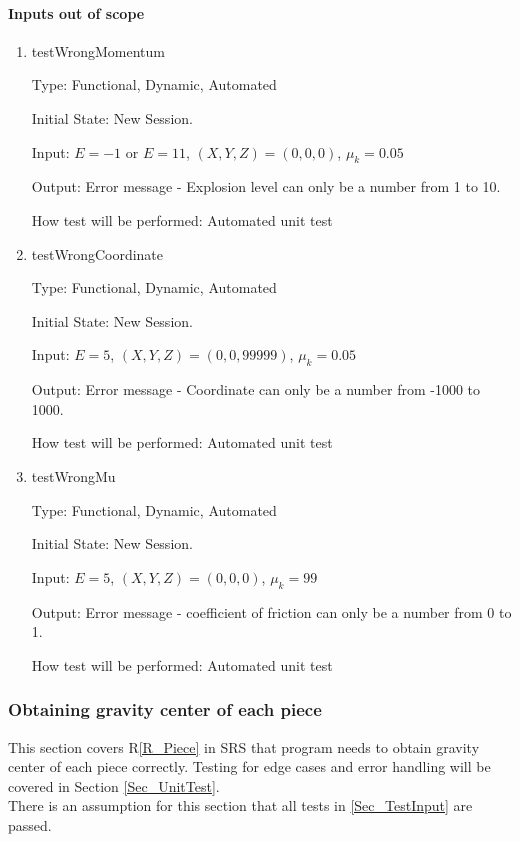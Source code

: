 \documentclass[12pt, titlepage]{article}
\newcommand{\rref}[1]{R\ref{#1}}
\begin{document}
\paragraph{Inputs out of scope}

\begin{enumerate}

\item{testWrongMomentum\\}

Type: Functional, Dynamic, Automated

Initial State: New Session.

Input: $E = -1$ or $E = 11$, $(X,Y,Z) = (0,0,0)$, $\mu_{k} = 0.05$  

Output: Error message - Explosion level can only be a number from 1 to 10.

How test will be performed: Automated unit test

\item{testWrongCoordinate\\}

Type: Functional, Dynamic, Automated

Initial State: New Session.

Input: $E = 5$, $(X,Y,Z) = (0,0,99999)$, $\mu_{k} = 0.05$  

Output: Error message - Coordinate can only be a number from -1000 to 1000.

How test will be performed: Automated unit test

\item{testWrongMu\\}

Type: Functional, Dynamic, Automated

Initial State: New Session.

Input: $E = 5$, $(X,Y,Z) = (0,0,0)$, $\mu_{k} = 99$  

Output: Error message - coefficient of friction can only be a number from 0 to 1.

How test will be performed: Automated unit test 

\end{enumerate}

\subsubsection{Obtaining gravity center of each piece}
\label{Sec_testGravityCenter}

This section covers \rref{R_Piece} in SRS that program needs to obtain gravity center of each piece correctly. Testing for edge cases and error handling will be covered in Section \ref{Sec_UnitTest}. \\
There is an assumption for this section that all tests in \ref{Sec_TestInput} are passed.
\end{document}
